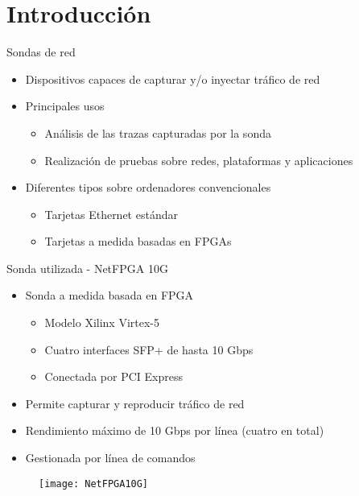 \section{Introducción}

\begin{frame}{Sondas de red}
  \begin{itemize}
    \item Dispositivos capaces de capturar y/o inyectar tráfico de red
    \item Principales usos
    \begin{itemize}
      \item Análisis de las trazas capturadas por la sonda
      \item Realización de pruebas sobre redes, plataformas y aplicaciones
    \end{itemize}
    \item Diferentes tipos sobre ordenadores convencionales
    \begin{itemize}
      \item Tarjetas Ethernet estándar
      \item Tarjetas a medida basadas en FPGAs
    \end{itemize}
  \end{itemize}
\end{frame}

\begin{frame}{Sonda utilizada - NetFPGA 10G}
  \begin{itemize}
    \item Sonda a medida basada en FPGA
    \begin{itemize}
      \item Modelo Xilinx Virtex-5
      \item Cuatro interfaces SFP+ de hasta 10 Gbps
      \item Conectada por PCI Express
    \end{itemize}
    \item Permite capturar y reproducir tráfico de red
    \item Rendimiento máximo de 10 Gbps por línea (cuatro en total)
    \item Gestionada por línea de comandos
  \end{itemize}
  \begin{figure}
    \texttt{[image: NetFPGA10G]}
  \end{figure}
\end{frame}
